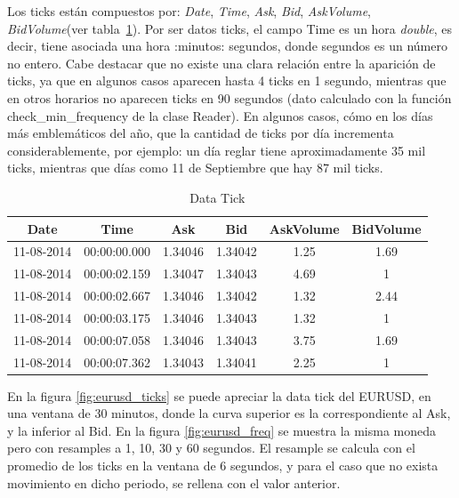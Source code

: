 Los ticks están compuestos por: \emph{Date}, \emph{Time}, \emph{Ask},
\emph{Bid}, \emph{AskVolume}, \emph{BidVolume}(ver tabla~\ref{tab:ticks}). Por
ser datos ticks, el campo Time es un hora \emph{double}, es decir, tiene
asociada una hora :minutos: segundos, donde segundos es un número no entero.
Cabe destacar que no existe una clara relación entre la aparición de ticks, ya
que en algunos casos aparecen hasta 4 ticks en 1 segundo, mientras que en otros
horarios no aparecen ticks en 90 segundos (dato calculado con la función
check\_min\_frequency de la clase Reader). En algunos casos, cómo en los días
más emblemáticos del año, que la cantidad de ticks por día incrementa
considerablemente, por ejemplo: un día reglar tiene aproximadamente 35 mil
ticks, mientras que días como 11 de Septiembre que hay 87 mil ticks. 

\begin{table}[h!]
\caption{Data Tick}
\label{tab:ticks}
\begin{center}
\begin{tabular}{|c|c|c|c|c|c|}
\hline
Date & Time & Ask & Bid& AskVolume & BidVolume \\
\hline
11-08-2014 & 00:00:00.000 & 1.34046 & 1.34042 & 1.25 & 1.69 \\
11-08-2014 & 00:00:02.159 & 1.34047 & 1.34043 & 4.69 & 1 \\
11-08-2014 & 00:00:02.667 & 1.34046 & 1.34042 & 1.32 & 2.44 \\
11-08-2014 & 00:00:03.175 & 1.34046 & 1.34043 & 1.32 & 1 \\
11-08-2014 & 00:00:07.058 & 1.34046 & 1.34043 & 3.75 & 1.69 \\
11-08-2014 & 00:00:07.362 & 1.34043 & 1.34041 & 2.25 & 1 \\
\hline
\end{tabular}
\end{center}
\end{table}
\newpage
En la figura \ref{fig:eurusd_ticks} se puede apreciar la data tick del EURUSD,
en una ventana de 30 minutos, donde la curva superior es la correspondiente al
Ask, y la inferior al Bid. En la figura \ref{fig:eurusd_freq} se muestra la
misma moneda pero con resamples a 1, 10, 30 y 60 segundos. El resample se
calcula con el promedio de los ticks en la ventana de 6 segundos, y para el
caso que no exista movimiento en dicho periodo, se rellena con el valor
anterior.

